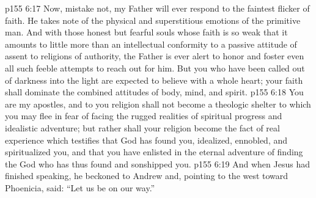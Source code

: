 \pc \vs p155 6:17 \textcolor{ubdarkred}{Now, mistake not, my Father will ever respond to the faintest flicker of faith. He takes note of the physical and superstitious emotions of the primitive man. And with those honest but fearful souls whose faith is so weak that it amounts to little more than an intellectual conformity to a passive attitude of assent to religions of authority, the Father is ever alert to honor and foster even all such feeble attempts to reach out for him. But you who have been called out of darkness into the light are expected to believe with a whole heart; your faith shall dominate the combined attitudes of body, mind, and spirit.}
\vs p155 6:18 \textcolor{ubdarkred}{You are my apostles, and to you religion shall not become a theologic shelter to which you may flee in fear of facing the rugged realities of spiritual progress and idealistic adventure; but rather shall your religion become the fact of real experience which testifies that God has found you, idealized, ennobled, and spiritualized you, and that you have enlisted in the eternal adventure of finding the God who has thus found and sonshipped you.}\plusone
\pc \vs p155 6:19 And when Jesus had finished speaking, he beckoned to Andrew and, pointing to the west toward Phoenicia, said: \textcolor{ubdarkred}{“Let us be on our way.”}
